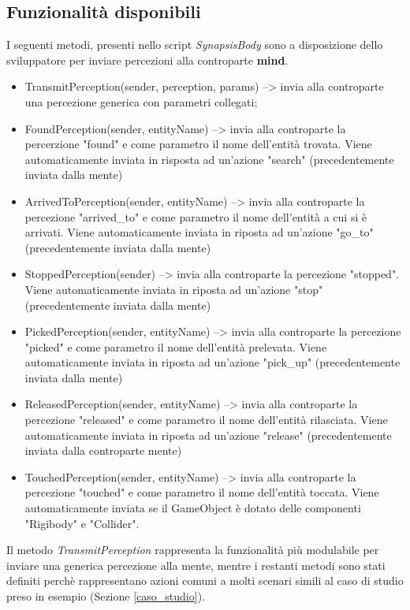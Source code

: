 \subsection{Funzionalità disponibili}
I seguenti metodi, presenti nello script \textit{SynapsisBody} sono a disposizione dello sviluppatore per inviare percezioni alla controparte \textbf{mind}.
\begin{itemize}
    \item TransmitPerception(sender, perception, params) --> invia alla controparte una percezione generica con parametri collegati;
    \item FoundPerception(sender, entityName) --> invia alla controparte la percerzione "found" e come parametro il nome dell'entità trovata. Viene automaticamente inviata in risposta ad un'azione "search" (precedentemente inviata dalla mente)
    \item ArrivedToPerception(sender, entityName) --> invia alla controparte la percezione "arrived\_to" e come parametro il nome dell'entità a cui si è arrivati. Viene automaticamente inviata in riposta ad un'azione "go\_to" (precedentemente inviata dalla mente)
    \item StoppedPerception(sender) --> invia alla controparte la percezione "stopped". Viene automaticamente inviata in riposta ad un'azione "stop" (precedentemente inviata dalla mente)
    \item PickedPerception(sender, entityName) --> invia alla controparte la percezione "picked" e come parametro il nome dell'entità prelevata. Viene automaticamente inviata in riposta ad un'azione "pick\_up" (precedentemente inviata dalla mente)
    \item ReleasedPerception(sender, entityName) --> invia alla controparte la percezione "released" e come parametro il nome dell'entità rilasciata. Viene automaticamente inviata in riposta ad un'azione "release" (precedentemente inviata dalla controparte mente)
    \item TouchedPerception(sender, entityName) --> invia alla controparte la percezione "touched" e come parametro il nome dell'entità toccata. Viene automaticamente inviata se il GameObject è dotato delle componenti "Rigibody" e "Collider".
\end{itemize}

Il metodo \textit{TransmitPerception} rappresenta la funzionalità più modulabile per inviare una generica percezione alla mente, mentre i restanti metodi sono stati definiti perchè rappresentano azioni comuni a molti scenari simili al caso di studio preso in esempio (Sezione \ref{caso_studio}).

